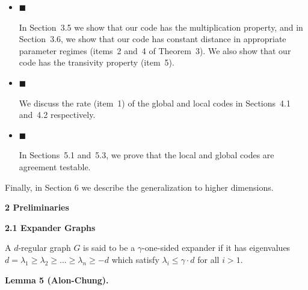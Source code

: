 \documentclass[10pt,a4paper]{article}
\begin{document}
\begin{itemize}


\item[] 
$\blacksquare$ 


In Section 3.5 we show that our code has the multiplication property, and in Section 3.6, we show that our code has constant distance in appropriate parameter regimes (items 2 and 4 of Theorem 3). We also show that our code has the transivity property (item 5).\par





\item[] 
$\blacksquare$ 


We discuss the rate (item 1) of the global and local codes in Sections 4.1 and 4.2 respectively.\par





\item[] 
$\blacksquare$ 


In Sections 5.1 and 5.3, we prove that the local and global codes are agreement testable.\par





\end{itemize}


Finally, in Section 6 we describe the generalization to higher dimensions.\par






\par\medskip\noindent\textbf{
2 Preliminaries}\par




\par\medskip\noindent\textbf{
2.1 Expander Graphs}\par




A $d$-regular graph $G$ is said to be a $\gamma$-one-sided expander if it has eigenvalues $d=\lambda_{1}\geq\lambda_{2}\geq...\geq\lambda_{n}\geq-d$ which satisfy $\lambda_{i}\leq\gamma\cdot d$ for all $i>1$.\par





\par\medskip\noindent\textbf{
\textbf{Lemma 5}\textbf{ }(Alon-Chung)\textbf{.}
}\par
\end{document}
